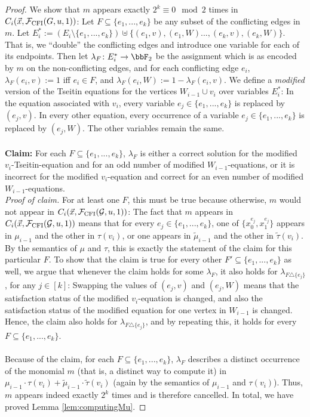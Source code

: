 \documentclass[10pt,a4paper]{article}
\newcommand{\Ff}{{\cal F}}
\newcommand{\Gg}{{\cal G}}
\newcommand{\CFI}{\Ff_{\mathrm{CFI}}}
\newcommand{\tautilde}{\tilde{\tau}}
\newcommand{\mutilde}{\tilde{\mu}}
\begin{document}
\begin{proof}
	We show that $m$ appears exactly $2^k \equiv 0 \mod 2$ times in $C_i(\vec x, \CFI(G, u, 1))$: Let $F \subseteq \{e_1,...,e_k\}$ be any subset of the conflicting edges in $m$. Let $E^*_i := (E_i \setminus \{e_1,..., e_k \} )\uplus \{  (e_1,v), (e_1,W)..., (e_k, v), (e_k, W) \}$. That is, we ``double'' the conflicting edges and introduce one variable for each of its endpoints. Then let $\lambda_F \colon E^*_i \to \bbF_2$ be the assignment which is as encoded by $m$ on the non-conflicting edges, and for each conflicting edge $e_i$, $\lambda_F(e_i,v) := 1$ iff $e_i \in F$, and $\lambda_F(e_i,W) := 1-\lambda_F(e_i,v)$. We define a \emph{modified} version of the Tseitin equations for the vertices $W_{i-1} \cup v_i$ over variables $E_i^*$: In the equation associated with $v_i$, every variable $e_j \in \{e_1,...,e_k\}$ is replaced by $(e_j,v)$. In every other equation, every occurrence of a variable $e_j \in \{e_1,...,e_k\}$ is replaced by $(e_j,W)$. The other variables remain the same.\\
	\\
	\textbf{Claim:} For each $F \subseteq \{e_1,...,e_k\}$, $\lambda_F$ is either a correct solution for the modified $v_i$-Tseitin-equation and for an odd number of modified $W_{i-1}$-equations, or it is incorrect for the modified $v_i$-equation and correct for an even number of modified $W_{i-1}$-equations.\\
	\textit{Proof of claim.} For at least one $F$, this must be true because otherwise, $m$ would not appear in $C_i(\vec x, \CFI(\Gg, u, 1))$: The fact that $m$ appears in $C_i(\vec x, \CFI(\Gg, u, 1))$ means that for every $e_j \in \{e_1,...,e_k\}$, one of $\{x_0^{e_j}, x_1^{e_j}\}$ appears in $\mu_{i-1}$ and the other in $\tau(v_i)$, or one appears in $\mutilde_{i-1}$ and the other in $\tautilde(v_i)$. By the semantics of $\mu$ and $\tau$, this is exactly the statement of the claim for this particular $F$. To show that the claim is true for every other $F' \subseteq \{e_1,...,e_k\}$ as well, we argue that whenever the claim holds for some $\lambda_F$, it also holds for $\lambda_{F \triangle \{e_j\}}$, for any $j \in [k]$: Swapping the values of $(e_j, v)$ and $(e_j, W)$ means that the satisfaction status of the modified $v_i$-equation is changed, and also the satisfaction status of the modified equation for one vertex in $W_{i-1}$ is changed. Hence, the claim also holds for $\lambda_{F \triangle \{e_j\}}$, and by repeating this, it holds for every $F \subseteq \{e_1,...,e_k\}$. \qedsymbol \\
	\\
	Because of the claim, for each $F \subseteq  \{e_1,...,e_k\}$, $\lambda_F$ describes a distinct occurrence of the monomial $m$ (that is, a distinct way to compute it) in $\mu_{i-1} \cdot \tau(v_i) + \mutilde_{i-1} \cdot \tautilde(v_i)$ (again by the semantics of $\mu_{i-1}$ and $\tau(v_i)$). Thus, $m$ appears indeed exactly $2^k$ times and is therefore cancelled.
	In total, we have proved Lemma \ref{lem:computingMu}.
\end{proof}
\end{document}
